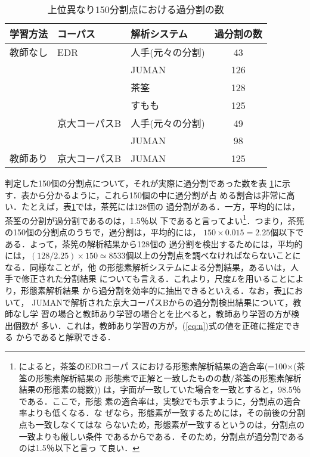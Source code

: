 \begin{table}[htbp]
  \begin{center}
    \caption{上位異なり150分割点における過分割の数}
    \begin{tabular}{|l|l|l|c|}
      \hline
      学習方法 & コーパス         & 解析システム     & 過分割の数 \\
      \hline
      \hline
      教師なし & EDR              & 人手(元々の分割) & 43 \\
      &                           & JUMAN            & 126\\
      &                           & 茶筌             & 128\\
      &                           & すもも           & 125\\
      \cline{2-4}
      &          京大コーパスB    & 人手(元々の分割) & 49\\
      &                           & JUMAN            & 98\\
      \hline
      教師あり & 京大コーパスB    & JUMAN            & 125\\
      \hline
    \end{tabular}
    \label{tab:errs}
  \end{center}
\end{table}

判定した150個の分割点について，それが実際に過分割であった数を表
\ref{tab:errs}に示す．表から分かるように，これら150個の中に過分割が占
める割合は非常に高い．たとえば，表\ref{tab:errs}では，茶筅には128個の
過分割がある．一方，平均的には，茶筌の分割が過分割であるのは，1.5％以
下であると言ってよい\footnote{\cite{fuchi98}によると，茶筌のEDRコーパ
  スにおける形態素解析結果の適合率(=100$\times$(茶筌の形態素解析結果の
  形態素で正解と一致したものの数/茶筌の形態素解析結果の形態素の総数))
  は，字面が一致していた場合を一致とすると，98.5％である．ここで，形態
  素の適合率は，実験2でも示すように，分割点の適合率よりも低くなる．な
  ぜなら，形態素が一致するためには，その前後の分割点も一致しなくてはな
  らないため，形態素が一致するというのは，分割点の一致よりも厳しい条件
  であるからである．そのため，分割点が過分割であるのは1.5％以下と言っ
  て良い．}．つまり，茶筅の150個の分割点のうちで，過分割は，平均的には，
$150 \times 0.015=2.25$個以下である．よって，茶筅の解析結果から128個の
過分割を検出するためには，平均的には，$(128/2.25) \times 150 \simeq
8533$個以上の分割点を調べなければならないことになる．同様なことが，他
の形態素解析システムによる分割結果，あるいは，人手で修正された分割結果
についても言える．これより，尺度$L$を用いることにより，形態素解析結果
から過分割を効率的に抽出できるといえる．なお，表\ref{tab:errs}において，
JUMANで解析された京大コーパスBからの過分割検出結果について，教師なし学
習の場合と教師あり学習の場合とを比べると，教師あり学習の方が検出個数が
多い．これは，教師あり学習の方が，(\ref{eq:n})式の値を正確に推定できる
からであると解釈できる．

